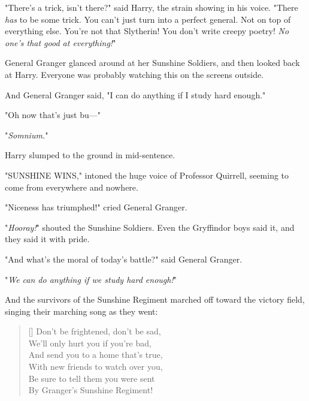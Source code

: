 "There's a trick, isn't there?" said Harry, the strain showing in his voice.
"There \emph{has} to be some trick. You can't just turn into a perfect general.
Not on top of everything else. You're not that Slytherin! You don't write
creepy poetry! \emph{No one's that good at everything!}"

General Granger glanced around at her Sunshine Soldiers, and then looked back
at Harry. Everyone was probably watching this on the screens outside.

And General Granger said, "I can do anything if I study hard enough."

"Oh now that's just bu---"

"\emph{Somnium.}"

Harry slumped to the ground in mid-sentence.

"SUNSHINE WINS," intoned the huge voice of Professor Quirrell, seeming to come
from everywhere and nowhere.

"Niceness has triumphed!" cried General Granger.

"\emph{Hooray!}" shouted the Sunshine Soldiers. Even the Gryffindor boys said
it, and they said it with pride.

"And what's the moral of today's battle?" said General Granger.

"\emph{We can do anything if we study hard enough!}"

And the survivors of the Sunshine Regiment marched off toward the victory
field, singing their marching song as they went:

\begin{verse}[\versewidth]
Don't be frightened, don't be sad,\\
We'll only hurt you if you're bad,\\
And send you to a home that's true,\\
With new friends to watch over you,\\
Be sure to tell them you were sent\\
By Granger's Sunshine Regiment!
\end{verse}
